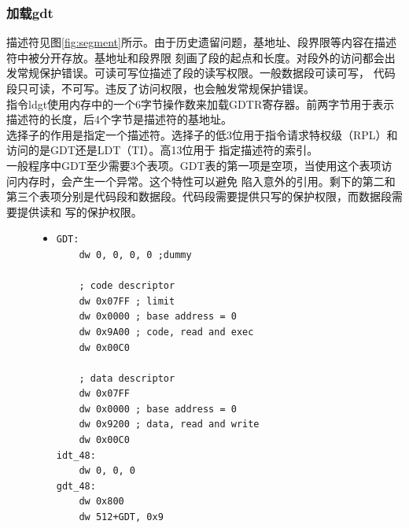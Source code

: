 \documentclass[a4paper]{article}
\begin{document}
        \subsubsection{加载gdt}
        描述符见图\ref{fig:segment}所示。由于历史遗留问题，基地址、段界限等内容在描述符中被分开存放。基地址和段界限
        刻画了段的起点和长度。对段外的访问都会出发常规保护错误。可读可写位描述了段的读写权限。一般数据段可读可写，
        代码段只可读，不可写。违反了访问权限，也会触发常规保护错误。\\ 

        指令ldgt使用内存中的一个6字节操作数来加载GDTR寄存器。前两字节用于表示描述符的长度，后4个字节是描述符的基地址。\\

        选择子的作用是指定一个描述符。选择子的低3位用于指令请求特权级（RPL）和访问的是GDT还是LDT（TI）。高13位用于
        指定描述符的索引。\\ 

        一般程序中GDT至少需要3个表项。GDT表的第一项是空项，当使用这个表项访问内存时，会产生一个异常。这个特性可以避免
        陷入意外的引用。剩下的第二和第三个表项分别是代码段和数据段。代码段需要提供只写的保护权限，而数据段需要提供读和
        写的保护权限。\\ 

        \begin{figure}
        \begin{itemize}
        \item[] \begin{lstlisting}[language={[x86masm]Assempler}, label=lst:gdtidt, caption=GDT和IDT]
GDT:
    dw 0, 0, 0, 0 ;dummy

    ; code descriptor
    dw 0x07FF ; limit
    dw 0x0000 ; base address = 0
    dw 0x9A00 ; code, read and exec
    dw 0x00C0 

    ; data descriptor
    dw 0x07FF 
    dw 0x0000 ; base address = 0
    dw 0x9200 ; data, read and write
    dw 0x00C0
idt_48:
    dw 0, 0, 0
gdt_48:
    dw 0x800
    dw 512+GDT, 0x9


        
        \end{lstlisting}
        \end{itemize}
        \end{figure}
\end{document}
